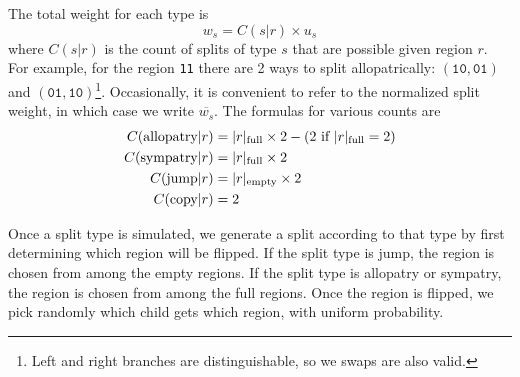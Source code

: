 \documentclass{article}
\begin{document}
The total weight for each type is
\begin{equation}
	w_s = C(s|r) \times u_s
\end{equation}
where $C(s|r)$ is the count of splits of type $s$ that are
possible given region $r$.
For example, for the region \texttt{11} there are 2 ways to split
allopatrically: $(\texttt{10}, \texttt{01})$ and $(\texttt{01},
\texttt{10})$\footnote{Left and right branches are distinguishable, so we swaps
	are also valid.}\footnotemark.
Occasionally, it is convenient to refer to the normalized split weight, in
which case we write \( \overline{w_s} \).
The formulas for various counts are
\begin{align*}
	C(\text{allopatry}|r) & =
	|r|_\text{full} \times 2 - (2 \text{ if } |r|_\text{full} = 2) \\
	C(\text{sympatry}|r)  & = |r|_\text{full} \times 2           \\ C(\text{jump}|r) & =
	|r|_\text{empty} \times 2                                    \\ C(\text{copy}|r) & = 2 \\
\end{align*}


Once a split type is simulated, we generate
a split according to that type by first determining which region will be
flipped\footnotemark.
If the split type is jump, the region is chosen from among the empty regions.
If the split type is allopatry or sympatry, the region is chosen from among the
full regions.
Once the region is flipped, we pick randomly which child gets which region,
with uniform probability.

\end{document}
